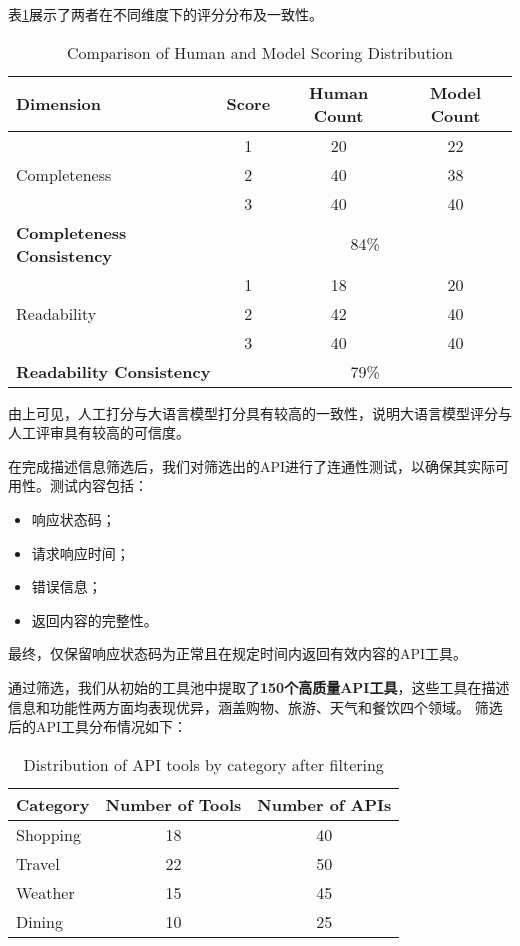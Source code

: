 表\ref{tab:api_score_comparison}展示了两者在不同维度下的评分分布及一致性。

\begin{table}[h]
  \centering
  \caption{Comparison of Human and Model Scoring Distribution}
  \label{tab:api_score_comparison}
  \begin{tabular}{l|c|c|c}
  \toprule
  \textbf{Dimension} & \textbf{Score} & \textbf{Human Count} & \textbf{Model Count} \\ \midrule
  \multirow{3}{*}{Completeness} & 1 & 20 & 22 \\ 
                                & 2 & 40 & 38 \\ 
                                & 3 & 40 & 40 \\ \hline
  \textbf{Completeness Consistency} & \multicolumn{3}{c}{84\%} \\ \midrule
  \multirow{3}{*}{Readability}  & 1 & 18 & 20 \\ 
                                & 2 & 42 & 40 \\ 
                                & 3 & 40 & 40 \\ \hline
  \textbf{Readability Consistency} & \multicolumn{3}{c}{79\%} \\ 
  \bottomrule
  \end{tabular}
  \end{table}

由上可见，人工打分与大语言模型打分具有较高的一致性，说明大语言模型评分与人工评审具有较高的可信度。


在完成描述信息筛选后，我们对筛选出的API进行了连通性测试，以确保其实际可用性。测试内容包括：
\begin{itemize}
    \item 响应状态码；
    \item 请求响应时间；
    \item 错误信息；
    \item 返回内容的完整性。
\end{itemize}

最终，仅保留响应状态码为正常且在规定时间内返回有效内容的API工具。

通过筛选，我们从初始的工具池中提取了\textbf{150个高质量API工具}，这些工具在描述信息和功能性两方面均表现优异，涵盖购物、旅游、天气和餐饮四个领域。
筛选后的API工具分布情况如下：

\begin{table}[h]
  \centering
  \caption{Distribution of API tools by category after filtering}
  \label{tab:api_distribution}
  \begin{tabular}{l|c|c}
  \toprule
  \textbf{Category} & \textbf{Number of Tools} & \textbf{Number of APIs} \\ \midrule
  Shopping & 18 & 40 \\ \hline
  Travel   & 22 & 50 \\ \hline
  Weather  & 15 & 45 \\ \hline
  Dining   & 10 & 25 \\ 
  \bottomrule
  \end{tabular}
  \end{table}

